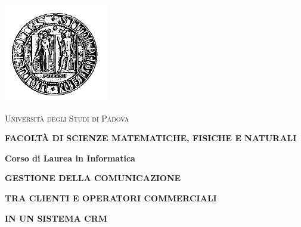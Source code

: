 \usepackage{multirow}


\begin{titlepage}
\vspace{20pt}

\begin{center}
\includegraphics[scale=0.7]{images/logo_uni}
\end{center}

\vspace{20pt}
\begin{center}

\begin{LARGE}\textsc{Universit\` a degli Studi di Padova}\end{LARGE}
\end{center}

\begin{center}
\textbf{\textsc{FACOLT\` A DI SCIENZE MATEMATICHE, FISICHE E NATURALI}}
\end{center}

\begin{center}
	\begin{large}
		\textbf{Corso di Laurea in Informatica}
	\end{large}
\end{center}

\vspace{30pt}

\begin{center}
	\begin{Large}
			\textbf{GESTIONE DELLA COMUNICAZIONE}
	\end{Large}
\end{center}			

\begin{center}
	\begin{Large}
			\textbf{TRA CLIENTI E OPERATORI COMMERCIALI}
	\end{Large}
\end{center}		


\begin{center}
	\begin{Large}
				\textbf{ IN UN SISTEMA CRM}
	\end{Large}
\end{center}		
\vspace{50pt}


\end{titlepage}
